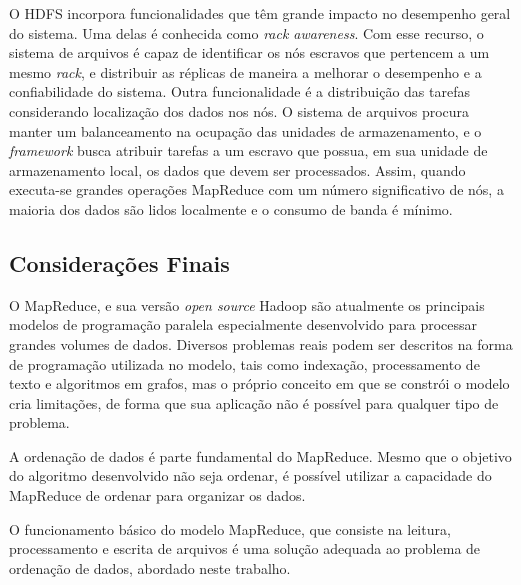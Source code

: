 O HDFS incorpora funcionalidades que têm grande impacto no desempenho geral do sistema.
Uma delas é conhecida como \textit{rack awareness}. Com esse recurso, o sistema de arquivos é capaz de identificar os nós escravos que pertencem a um mesmo \textit{rack}, e distribuir as réplicas de maneira a melhorar o desempenho e a confiabilidade do sistema.
Outra funcionalidade é a distribuição das tarefas considerando localização dos dados nos nós. O sistema de arquivos procura manter um balanceamento na ocupação das unidades de armazenamento, e o \textit{framework} busca atribuir tarefas a um escravo que possua, em sua unidade de armazenamento local, os dados que devem ser processados.
Assim, quando executa-se grandes operações MapReduce com um número significativo de nós, a maioria dos dados são lidos localmente e o consumo de banda é mínimo.

\subsection{Considerações Finais}

O MapReduce, e sua versão \textit{open source} Hadoop são atualmente os principais modelos de programação paralela especialmente desenvolvido para processar grandes volumes de dados. Diversos problemas reais podem ser descritos na forma de programação utilizada no modelo, tais como indexação, processamento de texto e algoritmos em grafos, mas o próprio conceito em que se constrói o modelo cria limitações, de forma que sua aplicação não é possível para qualquer tipo de problema. 

A ordenação de dados é parte fundamental do MapReduce. Mesmo que o objetivo do algoritmo desenvolvido não seja ordenar, é possível utilizar a capacidade do MapReduce de ordenar para organizar os dados.

O funcionamento básico do modelo MapReduce, que consiste na leitura, processamento e escrita de arquivos é uma solução adequada ao problema de ordenação de dados, abordado neste trabalho. 